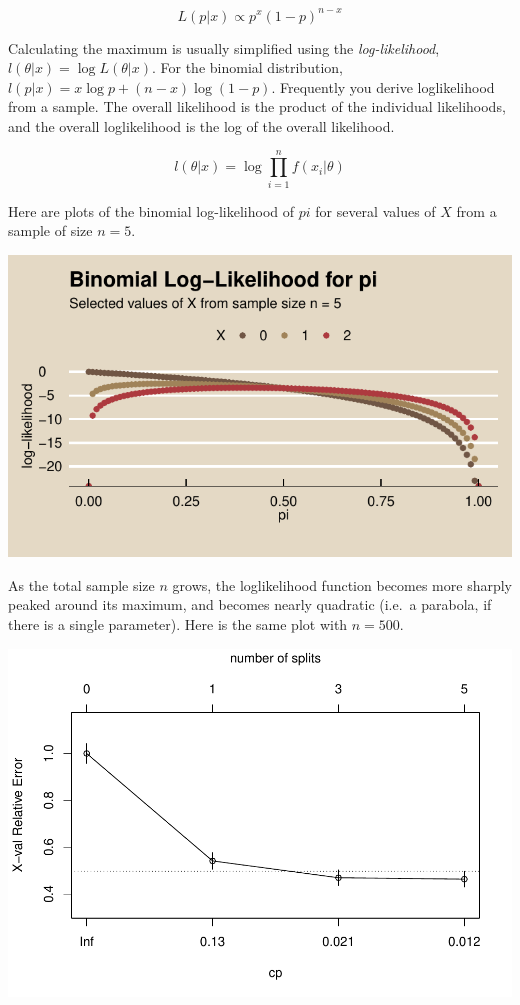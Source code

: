 \documentclass[
]{book}
\begin{document}
\[L(p|x) \propto p^x (1-p)^{n-x}\]

Calculating the maximum is usually simplified using the \emph{log-likelihood}, \(l(\theta|x) = \log L(\theta|x)\). For the binomial distribution, \(l(p|x) = x \log p + (n - x) \log (1 - p)\). Frequently you derive loglikelihood from a sample. The overall likelihood is the product of the individual likelihoods, and the overall loglikelihood is the log of the overall likelihood.

\[l(\theta|x) = \log \prod_{i=1}^n f(x_i|\theta)\]

Here are plots of the binomial log-likelihood of \(pi\) for several values of \(X\) from a sample of size \(n = 5\).

\includegraphics{data-sci_files/figure-latex/unnamed-chunk-29-1.pdf}

As the total sample size \(n\) grows, the loglikelihood function becomes more sharply peaked around its maximum, and becomes nearly quadratic (i.e.~a parabola, if there is a single parameter). Here is the same plot with \(n = 500\).

\includegraphics{data-sci_files/figure-latex/unnamed-chunk-30-1.pdf}
\end{document}
